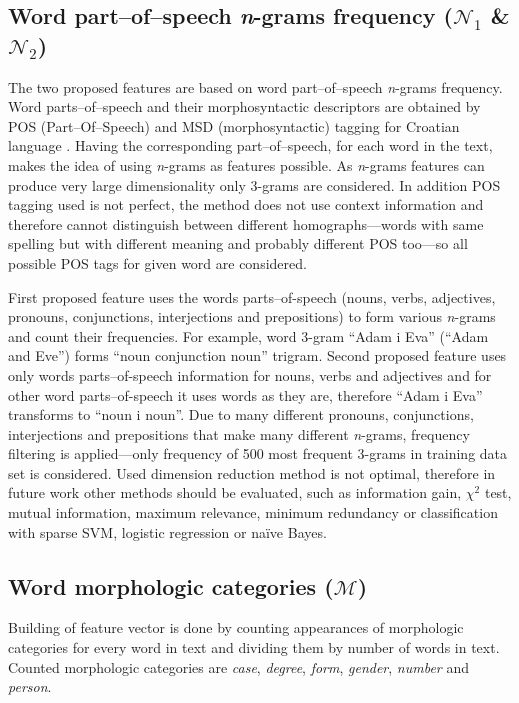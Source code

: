 \documentclass[11pt,english]{article}
\begin{document}
\begin{multicols}{2}
\subsection{Word part--of--speech \emph{n}-grams frequency ($\mathcal{N}_1$ \&
$\mathcal{N}_2$)}
\label{sec:ngrami-tipova}
The two proposed features are based on word part--of--speech \emph{n}-grams
frequency. Word parts--of--speech and their morphosyntactic descriptors are obtained by POS
(Part--Of--Speech) and MSD (morphosyntactic) tagging for Croatian language
\citep{snajder08automatic}. Having the corresponding part--of--speech, for
each word in the text, makes the idea of using \emph{n}-grams as features
possible. As \emph{n}-grams features can produce very large dimensionality 
only 3-grams are considered. In addition POS tagging used is not perfect, the
method does not use context information and therefore cannot distinguish between
different homographs---words with same spelling but with different meaning and probably
different POS too---so all possible POS tags for given word are considered.

First proposed feature uses the words parts--of-speech
(nouns, verbs, adjectives, pronouns, conjunctions, interjections and
prepositions) to form various \emph{n}-grams and count their frequencies. For
example, word 3-gram ``Adam i Eva'' (``Adam and Eve'') forms ``noun
conjunction noun'' trigram. Second proposed feature uses only words
parts--of-speech information for nouns, verbs and adjectives and for other word
parts--of-speech it uses words as they are, therefore ``Adam i Eva'' transforms
to ``noun i noun''. Due to many different pronouns, conjunctions, interjections
and prepositions that make many different \emph{n}-grams, frequency filtering
is applied---only frequency of 500 most frequent 3-grams in
training data set is considered. Used dimension reduction method is not optimal,
therefore in future work other methods should be evaluated, such as information
gain, $\chi^2$ test, mutual information, maximum relevance, minimum redundancy
or classification with sparse SVM, logistic regression or na\"ive Bayes.

\subsection{Word morphologic categories ($\mathcal{M}$)}
\label{sec:morphosyntactic}
Building of feature vector is done by counting appearances of morphologic
categories for every word in text and dividing them by number of words in text.
Counted morphologic categories are \emph{case}, \emph{degree}, \emph{form},
\emph{gender}, \emph{number} and \emph{person}.

\end{multicols}
\end{document}
